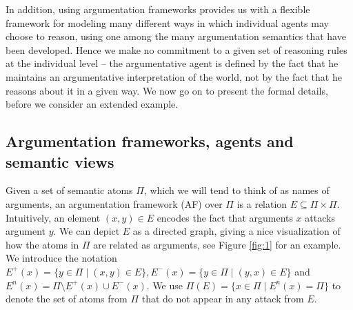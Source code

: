 \documentclass[greybox]{svmult}
\newcommand{\outa}[2]{#1^+(#2)}
\newcommand{\ina}[2]{#1^-(#2)}
\newcommand{\neu}[2]{#1^n(#2)}
\begin{document}
In addition, using argumentation frameworks provides us with a flexible framework for modeling many different ways in which individual agents may choose to reason, using one among the many argumentation semantics that have been developed. Hence we make no commitment to a given set of reasoning rules at the individual level -- the argumentative agent is defined by the fact that he maintains an argumentative interpretation of the world, not by the fact that he reasons about it in a given way. We now go on to present the formal details, before we consider an extended example.


\subsection{Argumentation frameworks, agents and semantic views}\label{subsec:arg}

Given a set of semantic atoms $\Pi$, which we will tend to think of as names of arguments, an argumentation framework (AF) over $\Pi$ is a relation $E \subseteq \Pi \times \Pi$. Intuitively, an element $(x,y) \in E$ encodes the fact that arguments $x$ attacks argument $y$. We can depict $E$ as a directed graph, giving a nice visualization of how the atoms in $\Pi$ are related as arguments, see Figure \ref{fig:1} for an example. 
We introduce the notation $\outa E x = \{y \in \Pi \mid (x,y) \in E\}, \ina E x = \{y \in \Pi \mid (y,x) \in E\}$ and $\neu E x = \Pi \setminus \outa E x \cup \ina E x$. We use $\Pi(E) = \{x \in \Pi \mid \neu E x = \Pi\}$ to denote the set of atoms from $\Pi$ that do not appear in any attack from $E$.
\end{document}
